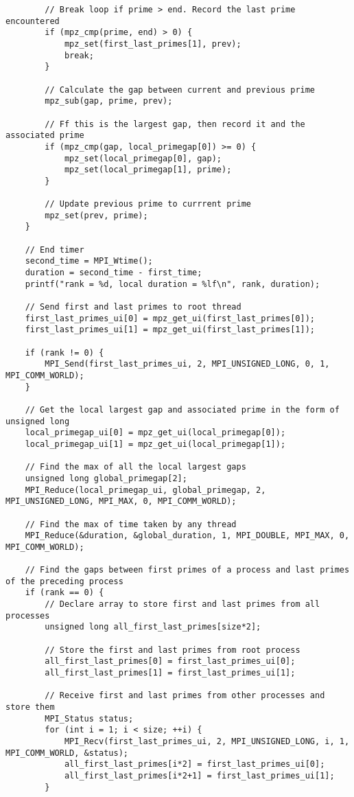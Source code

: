\documentclass[12pt]{article}
\begin{document}
{\begin{lstlisting}
		// Break loop if prime > end. Record the last prime encountered
		if (mpz_cmp(prime, end) > 0) {
			mpz_set(first_last_primes[1], prev);
			break;
		}

		// Calculate the gap between current and previous prime
		mpz_sub(gap, prime, prev);

		// Ff this is the largest gap, then record it and the associated prime
		if (mpz_cmp(gap, local_primegap[0]) >= 0) {
			mpz_set(local_primegap[0], gap);
			mpz_set(local_primegap[1], prime);
		}

		// Update previous prime to currrent prime
		mpz_set(prev, prime);
	}

	// End timer
	second_time = MPI_Wtime();
	duration = second_time - first_time;
	printf("rank = %d, local duration = %lf\n", rank, duration);

	// Send first and last primes to root thread
	first_last_primes_ui[0] = mpz_get_ui(first_last_primes[0]);
	first_last_primes_ui[1] = mpz_get_ui(first_last_primes[1]);

	if (rank != 0) {
		MPI_Send(first_last_primes_ui, 2, MPI_UNSIGNED_LONG, 0, 1, MPI_COMM_WORLD);
	}

	// Get the local largest gap and associated prime in the form of unsigned long
	local_primegap_ui[0] = mpz_get_ui(local_primegap[0]);
	local_primegap_ui[1] = mpz_get_ui(local_primegap[1]);

	// Find the max of all the local largest gaps
	unsigned long global_primegap[2];
	MPI_Reduce(local_primegap_ui, global_primegap, 2, MPI_UNSIGNED_LONG, MPI_MAX, 0, MPI_COMM_WORLD);

	// Find the max of time taken by any thread
	MPI_Reduce(&duration, &global_duration, 1, MPI_DOUBLE, MPI_MAX, 0, MPI_COMM_WORLD);

	// Find the gaps between first primes of a process and last primes of the preceding process
	if (rank == 0) {
		// Declare array to store first and last primes from all processes
		unsigned long all_first_last_primes[size*2];

		// Store the first and last primes from root process
		all_first_last_primes[0] = first_last_primes_ui[0];
		all_first_last_primes[1] = first_last_primes_ui[1];

		// Receive first and last primes from other processes and store them
		MPI_Status status;
		for (int i = 1; i < size; ++i) {
			MPI_Recv(first_last_primes_ui, 2, MPI_UNSIGNED_LONG, i, 1, MPI_COMM_WORLD, &status);
			all_first_last_primes[i*2] = first_last_primes_ui[0];
			all_first_last_primes[i*2+1] = first_last_primes_ui[1];
		}


\end{lstlisting}}
\end{document}
